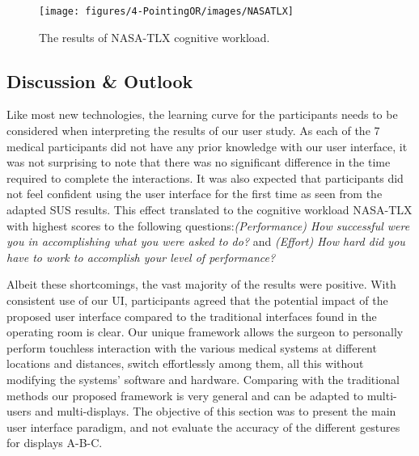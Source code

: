 \begin{figure}
	\centering
	\texttt{[image: figures/4-PointingOR/images/NASATLX]}
	\caption{The results of NASA-TLX cognitive workload.}
	\label{fig:NASATLX}       %
\end{figure}

\subsection{Discussion \& Outlook}
%
%
%
%
Like most new technologies, the learning curve for the participants needs to be considered when interpreting the results of our user study. As each of the 7 medical participants did not have any prior knowledge with our user interface, it was not surprising to note that there was no significant difference in the time required to complete the interactions.  It was also expected that participants did not feel confident using the user interface for the first time as seen from the adapted SUS results. This effect translated to the cognitive workload NASA-TLX with highest scores to the following questions:\textit{(Performance) How successful were you in accomplishing what you were asked to do?} and \textit{(Effort) How hard did you have to work to accomplish your level of performance?}

Albeit these shortcomings, the vast majority of the results were positive. With consistent use of our UI, participants agreed that the potential impact of the proposed user interface compared to the traditional interfaces found in the operating room is clear. Our unique framework allows the surgeon to personally perform touchless interaction with the various medical systems at different locations and distances, switch effortlessly among them, all this without modifying the systems’ software and hardware. Comparing with the traditional methods our proposed framework is very general and can be adapted to multi-users and multi-displays. The objective of this section was to present the main user interface paradigm, and not evaluate the accuracy of the different gestures for displays A-B-C.

